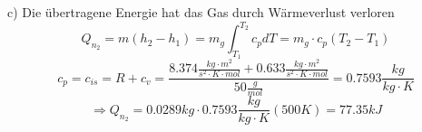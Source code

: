 c) Die übertragene Energie hat das Gas durch Wärmeverlust verloren
\[
Q_{n_2} = m(h_2 - h_1) = m_g \int_{T_1}^{T_2} c_p dT = m_g \cdot c_p (T_2 - T_1)
\]
\[
c_p = c_{is} = R + c_v = \frac{8.374 \frac{kg \cdot m^2}{s^2 \cdot K \cdot mol} + 0.633 \frac{kg \cdot m^2}{s^2 \cdot K \cdot mol}}{50 \frac{g}{mol}} = 0.7593 \frac{kg}{kg \cdot K}
\]
\[
\Rightarrow Q_{n_2} = 0.0289 kg \cdot 0.7593 \frac{kg}{kg \cdot K} (500 K) = 77.35 kJ
\]